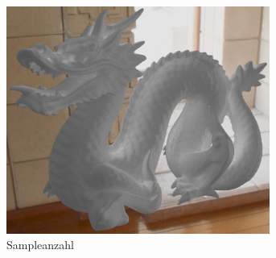 \begin{figure}[h]
\begin{subfigure}[t]{0.33\textwidth}
				\center
				\includegraphics[width=0.95\textwidth]{pic/irr_est-ra-dragon2-scount.png}
				\caption{Sampleanzahl}
			\end{subfigure}
			\caption{}
			\label{fig:irr-est-ra-dragon2}
		\end{figure}

		\FloatBarrier


